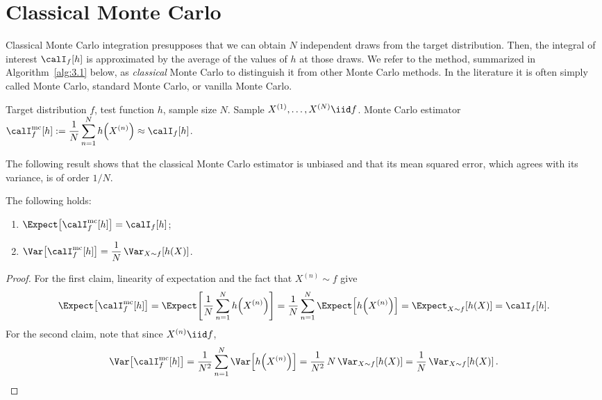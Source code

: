 
\section{Classical Monte Carlo}
\label{sec:3.1}

Classical Monte Carlo integration presupposes that we can obtain $N$ independent
draws from the target distribution. Then, the integral of interest $\calI_f[h]$
is approximated by the average of the values of $h$ at those draws. We refer to
the method, summarized in Algorithm~\ref{alg:3.1} below, as \emph{classical}
Monte Carlo to distinguish it from other Monte Carlo methods. In the literature
it is often simply called Monte Carlo, standard Monte Carlo, or vanilla Monte
Carlo.

\begin{algorithm}[H]
\caption{Classical Monte Carlo Integration}
\label{alg:3.1}
\begin{algorithmic}[1]
\Require Target distribution $f$, test function $h$, sample size $N$.
\State Sample $X^{(1)}, \ldots, X^{(N)} \iid f$.
\Ensure Monte Carlo estimator
  $\calI_f^{\mathrm{mc}}[h] := \dfrac{1}{N} \displaystyle\sum_{n=1}^{N}
   h\!\left(X^{(n)}\right) \approx \calI_f[h]$.
\end{algorithmic}
\end{algorithm}

The following result shows that the classical Monte Carlo estimator is unbiased
and that its mean squared error, which agrees with its variance, is of order
$1/N$.

\begin{theorem}
\label{thm:3.1}
The following holds:
\begin{enumerate}
  \item $\Expect\!\left[\calI_f^{\mathrm{mc}}[h]\right] = \calI_f[h]$;
  \item $\Var\!\left[\calI_f^{\mathrm{mc}}[h]\right]
         = \dfrac{1}{N}\,\Var_{X \sim f}\!\left[h(X)\right]$.
\end{enumerate}
\end{theorem}

\begin{proof}
For the first claim, linearity of expectation and the fact that $X^{(n)} \sim f$
give
\[
  \Expect\!\left[\calI_f^{\mathrm{mc}}[h]\right]
  = \Expect\!\left[\frac{1}{N}\sum_{n=1}^{N} h\!\left(X^{(n)}\right)\right]
  = \frac{1}{N}\sum_{n=1}^{N} \Expect\!\left[h\!\left(X^{(n)}\right)\right]
  = \Expect_{X \sim f}\!\left[h(X)\right]
  = \calI_f[h].
\]
For the second claim, note that since $X^{(n)} \iid f$,
\[
  \Var\!\left[\calI_f^{\mathrm{mc}}[h]\right]
  = \frac{1}{N^2}\sum_{n=1}^{N} \Var\!\left[h\!\left(X^{(n)}\right)\right]
  = \frac{1}{N^2}\, N\, \Var_{X \sim f}\!\left[h(X)\right]
  = \frac{1}{N}\,\Var_{X \sim f}\!\left[h(X)\right]. \qedhere
\]
\end{proof}

